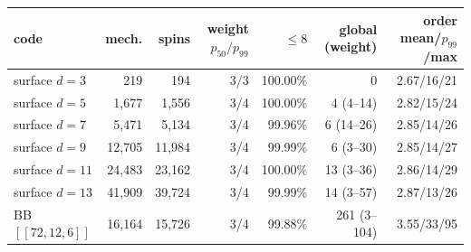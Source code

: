 \begin{tabular}{lrrrrrr}
\toprule
code & mech. & spins & weight $p_{50}/p_{99}$ & $\le 8$ & global (weight) & order mean/$p_{99}$/max\\
\midrule
surface $d=3$ & 219 & 194 & 3/3 & 100.00\% & 0 & 2.67/16/21\\
surface $d=5$ & 1{,}677 & 1{,}556 & 3/4 & 100.00\% & 4 (4--14) & 2.82/15/24\\
surface $d=7$ & 5{,}471 & 5{,}134 & 3/4 & 99.96\% & 6 (14--26) & 2.85/14/26\\
surface $d=9$ & 12{,}705 & 11{,}984 & 3/4 & 99.99\% & 6 (3--30) & 2.85/14/27\\
surface $d=11$ & 24{,}483 & 23{,}162 & 3/4 & 100.00\% & 13 (3--36) & 2.86/14/29\\
surface $d=13$ & 41{,}909 & 39{,}724 & 3/4 & 99.99\% & 14 (3--57) & 2.87/13/26\\
BB $[[72,12,6]]$ & 16{,}164 & 15{,}726 & 3/4 & 99.88\% & 261 (3--104) & 3.55/33/95\\
\bottomrule
\end{tabular}
